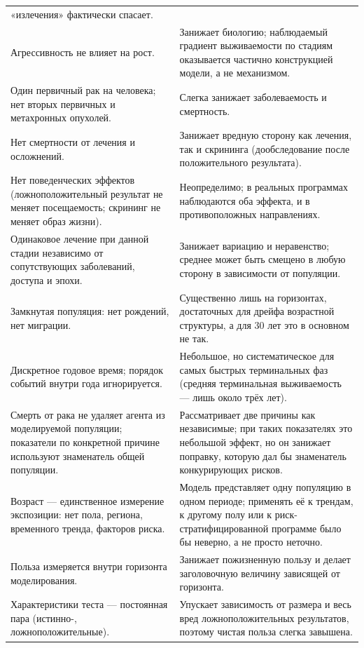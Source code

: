 \documentclass[12pt,a4paper]{article}
\begin{document}
{\begin{center}
\begin{tabular}{@{}p{8.0cm}p{7.6cm}@{}}
«излечения» фактически спасает. \\
Агрессивность не влияет на рост. & Занижает биологию; наблюдаемый градиент выживаемости по стадиям
оказывается частично конструкцией модели, а не механизмом. \\
Один первичный рак на человека; нет вторых первичных и метахронных опухолей. & Слегка занижает
заболеваемость и смертность. \\
Нет смертности от лечения и осложнений. & Занижает вредную сторону как лечения, так и скрининга
(дообследование после положительного результата). \\
Нет поведенческих эффектов (ложноположительный результат не меняет посещаемость; скрининг не меняет образ
жизни). & Неопределимо; в реальных программах наблюдаются оба эффекта, и в противоположных направлениях. \\
Одинаковое лечение при данной стадии независимо от сопутствующих заболеваний, доступа и эпохи. & Занижает
вариацию и неравенство; среднее может быть смещено в любую сторону в зависимости от популяции. \\
Замкнутая популяция: нет рождений, нет миграции. & Существенно лишь на горизонтах, достаточных для дрейфа
возрастной структуры, а для 30 лет это в основном не так. \\
Дискретное годовое время; порядок событий внутри года игнорируется. & Небольшое, но систематическое для
самых быстрых терминальных фаз (средняя терминальная выживаемость --- лишь около трёх лет). \\
Смерть от рака не удаляет агента из моделируемой популяции; показатели по конкретной причине используют
знаменатель общей популяции. & Рассматривает две причины как независимые; при таких показателях это
небольшой эффект, но он занижает поправку, которую дал бы знаменатель конкурирующих рисков. \\
Возраст --- единственное измерение экспозиции: нет пола, региона, временного тренда, факторов риска. &
Модель представляет одну популяцию в одном периоде; применять её к трендам, к другому полу или к
риск-стратифицированной программе было бы неверно, а не просто неточно. \\
Польза измеряется внутри горизонта моделирования. & Занижает пожизненную пользу и делает заголовочную
величину зависящей от горизонта. \\
Характеристики теста --- постоянная пара (истинно-, ложноположительные). & Упускает зависимость от размера и
весь вред ложноположительных результатов, поэтому чистая польза слегка завышена. \\

\end{tabular}
\end{center}}
\end{document}

